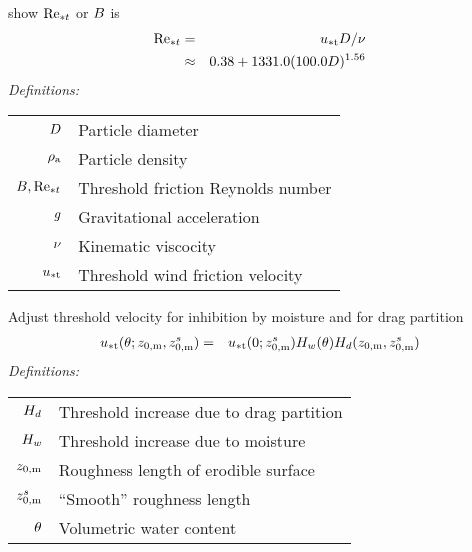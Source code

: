 \documentclass[final,dvips]{foils}
\begin{document}
\rotatefoilhead{\bgl
\Large\textcolor{blue}{\hfill Threshold Friction Velocity, continued\hfill}}\vspace{-0.5in}\large
\cite{MaB95} show $\rynnbrfrcthr$ or $\BBB$ is
\begin{eqnarray}
\mathrm{Re}_{* t} & = & u_{* \mathrm{t}} D / \nu \\
& \approx & 0.38 + 1331.0 (100.0 D )^{1.56}
\end{eqnarray}
\emph{Definitions:}
\begin{table}
\begin{tabular}{ >{$}r<{$} l}
\dmt & Particle diameter \\[0.5ex]
\dnsaer & Particle density \\[0.5ex]
\BBB, \rynnbrfrcthr & Threshold friction Reynolds number \\[0.5ex]
\grv & Gravitational acceleration \\[0.5ex]
\vscknm & Kinematic viscocity \\[0.5ex]
\wndfrcthr & Threshold wind friction velocity \\[0.5ex]
\end{tabular}
\end{table}

\rotatefoilhead{\bgl
\Large\textcolor{blue}{\hfill Threshold Friction Velocity, continued\hfill}}\vspace{-0.5in}\large
Adjust threshold velocity for inhibition by moisture and for drag partition 
\begin{eqnarray}
u_{* \mathrm{t}}(\theta;z_{0,\mathrm{m}},z_{0,\mathrm{m}}^{s}) & = & u_{* \mathrm{t}}(0;z_{0,\mathrm{m}}^{s})
H_{w} (\theta) H_{d} (z_{0,\mathrm{m}},z_{0,\mathrm{m}}^{s})
\label{eqn:wnd_frc_thr_wet_dfn}
\end{eqnarray}
\emph{Definitions:}
\begin{table}
\begin{tabular}{ >{$}r<{$} l}
\frcthrdrg & Threshold increase due to drag partition \\[0.5ex]
\frcthrwet & Threshold increase due to moisture \\[0.5ex]
\rghmmn & Roughness length of erodible surface \\[0.5ex]
\rghmmnsmt & ``Smooth'' roughness length \\[0.5ex]
\vwc & Volumetric water content \\[0.5ex]
\end{tabular}
\end{table}
\end{document}
